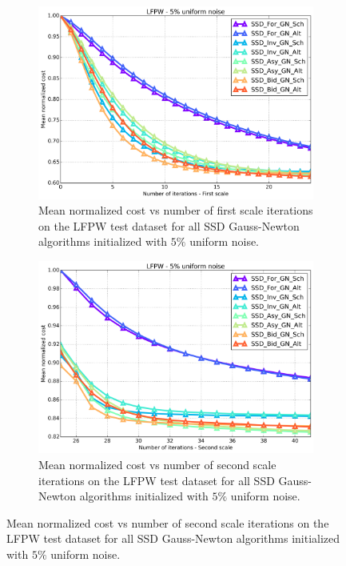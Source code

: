 \begin{figure}[p]
\begin{subfigure}{0.48\textwidth}
	\end{subfigure}
	\par\bigskip\bigskip
	\begin{subfigure}{0.48\textwidth}
	    \includegraphics[width=\textwidth]{experiments/algorithms/ssd_gn/mean_cost_vs_iters1_ssd_gn_5.png}
	    \caption{Mean normalized cost vs number of first scale iterations on the LFPW test dataset for all SSD Gauss-Newton algorithms initialized with $5\%$ uniform noise.}
	    \label{fig:mean_cost_vs_iters1_ssd_gn_5}
	\end{subfigure}
	\hfill
	\begin{subfigure}{0.48\textwidth}
	    \includegraphics[width=\textwidth]{experiments/algorithms/ssd_gn/mean_cost_vs_iters2_ssd_gn_5.png}
	    \caption{Mean normalized cost vs number of second scale iterations on the LFPW test dataset for all SSD Gauss-Newton algorithms initialized with $5\%$ uniform noise.}

\end{subfigure}
\end{figure}
